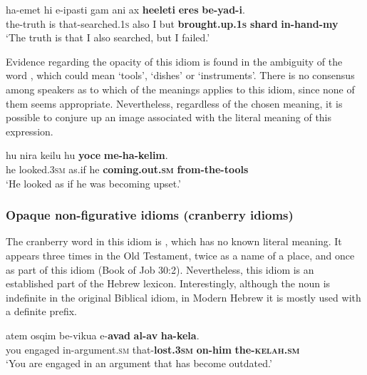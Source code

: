\documentclass[output=paper]{langsci/langscibook}
\begin{document}
	\ea\label{xeres-canon}
	\gll ha-{\alef}emet hi {\shin}e-{\het}ipasti gam {\alef}ani {\alef}ax \textbf{he{\ayin}eleti} \textbf{{\het}eres} \textbf{be-yad-i}.\\
	   the-truth is that-searched.\textsc{1s} also I but \textbf{brought.up.\textsc{1s}} \textbf{shard} \textbf{in-hand-my} \\
	\glt `The truth is that I also searched, but I failed.'
	\z	

\noindent\textbf{}
Evidence regarding the opacity of this idiom is found in the ambiguity of the word , which could mean `tools', `dishes' or `instruments'. There is no consensus among speakers as to which of the meanings applies to this idiom, since none of them seems appropriate. Nevertheless, regardless of the chosen meaning, it is possible to conjure up an image associated with the literal meaning of this expression.

	\ea\label{kelim-canon}
	\gll hu nir{\alef}a ke{\alef}ilu hu \textbf{yoce} \textbf{me-ha-kelim}.\\
	   he looked.\textsc{3sm} as.if he \textbf{coming.out.\textsc{sm}} \textbf{from-the-tools}\\
	\glt `He looked as if he was becoming upset.'
	\z

\subsubsection{Opaque non-figurative idioms (cranberry idioms)}
\label{sec:cranberry}

\noindent \textbf{} The cranberry word in this idiom is , which has no known literal meaning. It appears three times in the Old Testament, twice as a name of a place, and once as part of this idiom (Book of Job 30:2). Nevertheless, this idiom is an established part of the Hebrew lexicon. Interestingly, although the noun  is indefinite in the original Biblical idiom, in Modern Hebrew it is mostly used with a definite prefix.

	\ea\label{kelax-canon}
    	\gll {\alef}atem {\ayin}osqim be-vikua{\het} {\shin}e-\textbf{{\alef}avad} \textbf{{\ayin}al-av} \textbf{ha-kela{\het}}.\\
    	   you engaged in-argument.\textsc{sm} that-\textbf{lost.\textsc{3sm}} \textbf{on-him} \textbf{the-\textsc{kelah}.\textsc{sm}}\\
    	\glt `You are engaged in an argument that has become outdated.'
	\z
\end{document}

